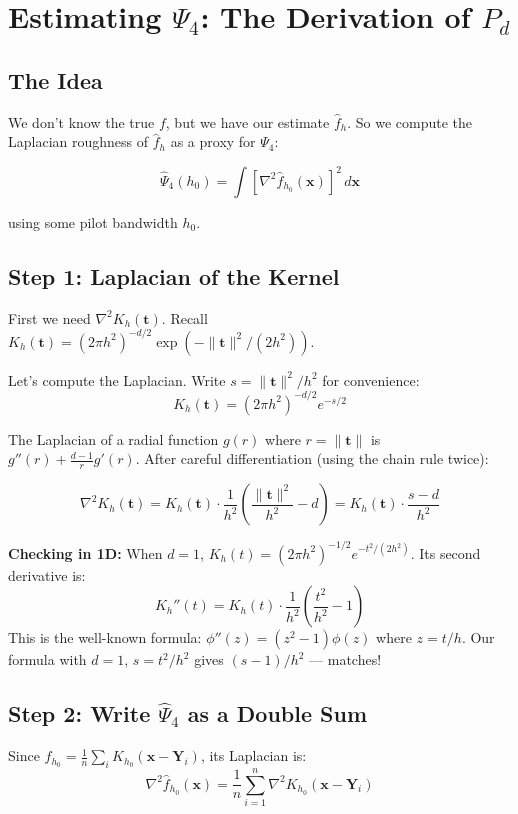 \documentclass[12pt]{article}
\newcommand{\note}[1]{\begin{tcolorbox}[colback=yellow!5,colframe=yellow!60!black,breakable]\small #1\end{tcolorbox}}
\begin{document}
\section{Estimating $\Psi_4$: The Derivation of $P_d$}

\subsection{The Idea}

We don't know the true $f$, but we have our estimate $\hat{f}_h$. So we compute the Laplacian roughness of $\hat{f}_h$ as a proxy for $\Psi_4$:

$$\hat\Psi_4(h_0) = \int [\nabla^2 \hat{f}_{h_0}(\mathbf{x})]^2\,d\mathbf{x}$$

using some pilot bandwidth $h_0$.

\subsection{Step 1: Laplacian of the Kernel}

First we need $\nabla^2 K_h(\mathbf{t})$. Recall $K_h(\mathbf{t}) = (2\pi h^2)^{-d/2}\exp(-\|\mathbf{t}\|^2/(2h^2))$.

Let's compute the Laplacian. Write $s = \|\mathbf{t}\|^2/h^2$ for convenience:
$$K_h(\mathbf{t}) = (2\pi h^2)^{-d/2} e^{-s/2}$$

The Laplacian of a radial function $g(r)$ where $r = \|\mathbf{t}\|$ is $g''(r) + \frac{d-1}{r}g'(r)$. After careful differentiation (using the chain rule twice):

$$\nabla^2 K_h(\mathbf{t}) = K_h(\mathbf{t}) \cdot \frac{1}{h^2}\left(\frac{\|\mathbf{t}\|^2}{h^2} - d\right) = K_h(\mathbf{t}) \cdot \frac{s - d}{h^2}$$

\note{
\textbf{Checking in 1D:} When $d=1$, $K_h(t) = (2\pi h^2)^{-1/2}e^{-t^2/(2h^2)}$. Its second derivative is:
$$K_h''(t) = K_h(t) \cdot \frac{1}{h^2}\left(\frac{t^2}{h^2} - 1\right)$$
This is the well-known formula: $\phi''(z) = (z^2-1)\phi(z)$ where $z = t/h$. Our formula with $d=1$, $s = t^2/h^2$ gives $(s-1)/h^2$ --- matches! \checkmark
}

\subsection{Step 2: Write $\hat\Psi_4$ as a Double Sum}

Since $\hat{f}_{h_0} = \frac{1}{n}\sum_i K_{h_0}(\mathbf{x} - \mathbf{Y}_i)$, its Laplacian is:
$$\nabla^2\hat{f}_{h_0}(\mathbf{x}) = \frac{1}{n}\sum_{i=1}^n \nabla^2 K_{h_0}(\mathbf{x} - \mathbf{Y}_i)$$
\end{document}
